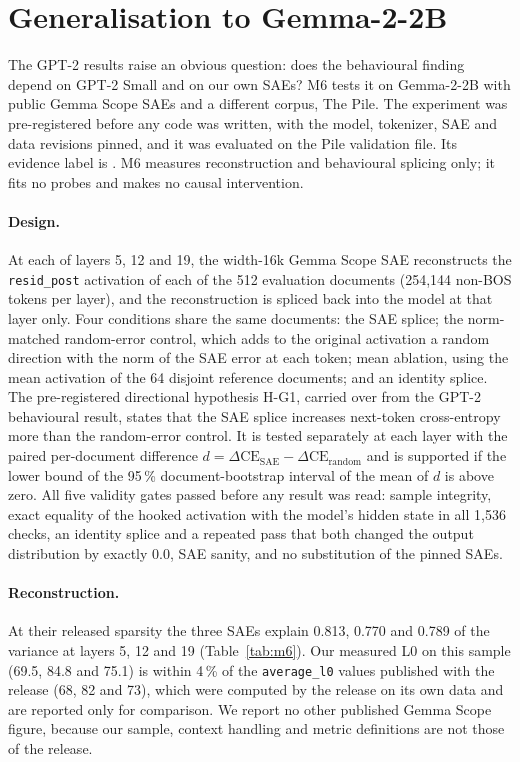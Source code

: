 \section{Generalisation to Gemma-2-2B}\label{sec:gemma}

The GPT-2 results raise an obvious question: does the behavioural finding depend on GPT-2 Small and on our own SAEs?
M6 tests it on Gemma-2-2B with public Gemma Scope SAEs and a different corpus, The Pile. The experiment was
pre-registered before any code was written, with the model, tokenizer, SAE and data revisions pinned, and it was
evaluated on the Pile validation file. Its evidence label is . M6 measures reconstruction and
behavioural splicing only; it fits no probes and makes no causal intervention.

\paragraph{Design.} At each of layers 5, 12 and 19, the width-16k Gemma Scope SAE reconstructs the \texttt{resid\_post}
activation of each of the 512 evaluation documents (254{,}144 non-BOS tokens per layer), and the reconstruction is
spliced back into the model at that layer only. Four conditions share the same documents: the SAE splice; the
norm-matched random-error control, which adds to the original activation a random direction with the norm of the SAE
error at each token; mean ablation, using the mean activation of the 64 disjoint reference documents; and an identity
splice. The pre-registered directional hypothesis H-G1, carried over from the GPT-2 behavioural result, states that the
SAE splice increases next-token cross-entropy more than the random-error control. It is tested separately at each layer
with the paired per-document difference $d=\Delta\mathrm{CE}_{\text{SAE}}-\Delta\mathrm{CE}_{\text{random}}$ and is
supported if the lower bound of the 95\,\% document-bootstrap interval of the mean of $d$ is above zero. All five
validity gates passed before any result was read: sample integrity, exact equality of the hooked activation with the
model's hidden state in all 1{,}536 checks, an identity splice and a repeated pass that both changed the output
distribution by exactly 0.0, SAE sanity, and no substitution of the pinned SAEs.

\paragraph{Reconstruction.} At their released sparsity the three SAEs explain 0.813, 0.770 and 0.789 of the variance at
layers 5, 12 and 19 (Table~\ref{tab:m6}). Our measured L0 on this sample (69.5, 84.8 and 75.1) is within 4\,\% of the
\texttt{average\_l0} values published with the release (68, 82 and 73), which were computed by the release on its own
data and are reported only for comparison. We report no other published Gemma Scope figure, because our sample,
context handling and metric definitions are not those of the release.


